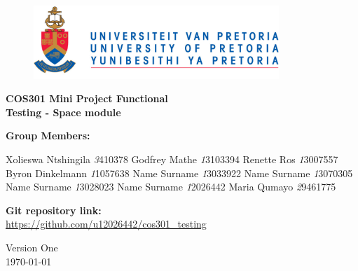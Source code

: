\begin{titlepage}
	\begin{center}
		
		\begin{figure}[t]
			\centering
			\includegraphics[width=350px]{UP_Logo.png}
		\end{figure}		
		
		\textbf{\LARGE COS301 Mini Project Functional \\Testing - Space module\\}
		
		\vspace{1 cm}
		
		\LARGE{\textbf{Group Members: }}
		

		\begin{flushright} \large
			Xolieswa Ntshingila \emph3410378\newline
			Godfrey Mathe \emph13103394 \newline
			Renette Ros \emph13007557\newline
			Byron Dinkelmann \emph11057638\newline
			Name Surname \emph13033922\newline
			Name Surname \emph13070305\newline
			Name Surname \emph13028023\newline
			Name Surname \emph12026442\newline
			Maria Qumayo \emph29461775\newline
		\end{flushright}
		
	
		
		\textbf{Git repository link:\\}
		 \url{ https://github.com/u12026442/cos301_testing}
		
		\vfill
		
		{\LARGE Version One}
		\\
		{\large \today}		
		
		
	\end{center}
\end{titlepage}
